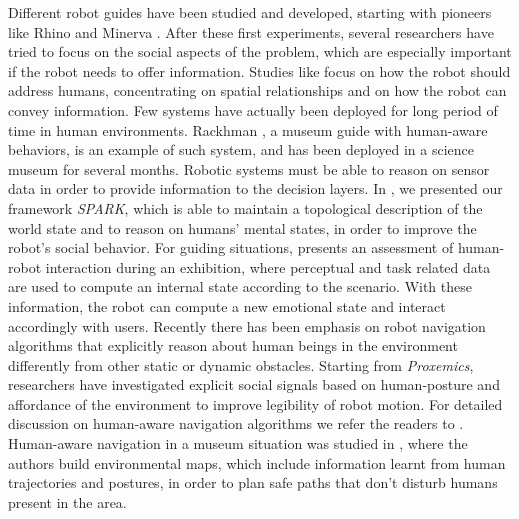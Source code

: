 Different robot guides have been studied and developed, starting with pioneers like Rhino and Minerva \cite{thrun2000probabilistic}. After these first experiments, several researchers have tried to focus on the social aspects of the problem, which are especially important if the robot needs to offer information. Studies like \cite{yousuf2012development,evers2014development} focus on how the robot should address humans, concentrating on spatial relationships and on how the robot can convey information. Few systems have actually been deployed for long period of time in human environments. Rackhman \cite{clodic2006rackham}, a museum guide with human-aware behaviors, is an example of such system, and has been deployed in a science museum for several months. 
%
%
Robotic systems must be able to reason on sensor data in order to provide information to the decision layers. In \cite{Milliez2014}, we presented our framework \emph{SPARK}, which is able to maintain a topological description of the world state and  to reason on humans' mental states, in order to improve the robot's social behavior. For guiding situations, \cite{Jensen2005} presents an assessment of human-robot interaction during an exhibition, where perceptual and task related data are used to compute an internal state according to the scenario. With these information, the robot can compute a new emotional state and interact accordingly with users.
Recently there has been emphasis on robot navigation algorithms that explicitly reason about human beings in the environment differently from other static or dynamic obstacles. Starting from \textit{Proxemics}, researchers have investigated explicit social signals based on human-posture and affordance of the environment to improve legibility of robot motion. For detailed discussion on human-aware navigation algorithms we refer the readers to \cite{kruse2013human,rios-ijsr-2014}. Human-aware navigation in a museum situation was studied in \cite{samejima2015building}, where the authors build environmental maps, which include information learnt from human trajectories and postures, in order to plan safe paths that don't disturb humans present in the area. 


